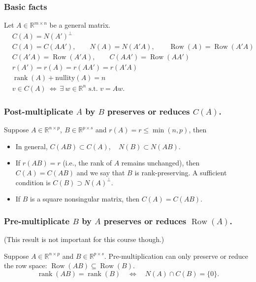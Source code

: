 \documentclass{article}
\theoremstyle{break}
\newcommand{\R}{\ensuremath{\mathbb{R}}}
\newcommand{\st}{\ensuremath{\text{ s.t. }}}
\DeclareMathOperator{\Row}{Row}
\DeclareMathOperator{\rank}{rank}
\begin{document}
\subsubsection{Basic facts}
Let $A \in \R^{m \times n}$ be a general matrix.
\begin{align*}
    & C(A) = N(A')^\perp\\
    & C(A) = C(AA'), \qquad N(A) = N(A'A), \qquad \Row(A) = \Row(A'A)\\
    & C(A'A) = \Row(A'A), \qquad C(AA') = \Row(AA')\\
    & r(A') = r(A) = r(A A') = r(A'A)\\
    & \rank(A) + \mathrm{nullity}(A) = n \\
    & v \in C(A) \ \Leftrightarrow\ \exists\ w\in\R^n \st v = Aw.
\end{align*}

\subsubsection{Post-multiplicate $A$ by $B$ preserves or reduces $C(A)$.}
Suppose $A \in \R^{n \times p},\ B \in \R^{p \times s}$ and $r(A) = r \leq \min(n,p)$, then
\begin{itemize}
    \item In general, $C(AB) \subset C(A), \quad N(B) \subset N(AB)$.
    \item If $r(AB) = r$ (i.e., the rank of $A$ remains unchanged), then $C(A) = C(AB)$ and we say that $B$ is rank-preserving. A sufficient condition is $C(B) \supset N(A)^\perp$.
    \item If $B$ is a square nonsingular matrix, then $C(A) = C(AB)$.
\end{itemize}

\subsubsection{Pre-multiplicate $B$ by $A$ preserves or reduces $\Row(A)$.}

(This result is not important for this course though.)

Suppose $A\in\mathbb R^{n\times p}$ and $B\in\mathbb R^{p\times s}$. Pre-multiplication can only preserve or reduce the row space: $\Row(AB)\subseteq \Row(B)$.
\[
\rank(AB)=\rank(B)
\quad\Leftrightarrow\quad
N(A)\cap C(B)=\{0\}.
\]
\end{document}
